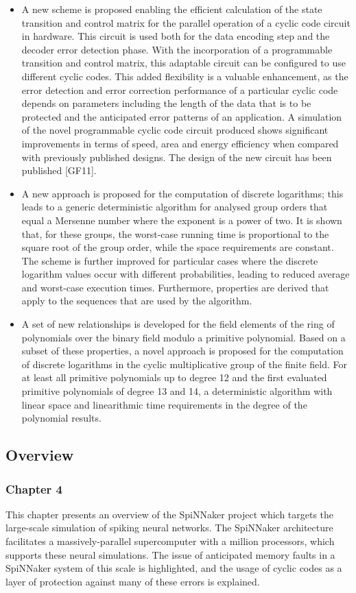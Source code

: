 \documentclass[a4paper, 11pt]{article}
\begin{document}
\begin{itemize}
\item A new scheme is proposed enabling the efficient calculation of the state transition and control matrix for the parallel operation of a cyclic code circuit in hardware. This circuit is used both for the data encoding step and the decoder error detection phase. With the incorporation of a programmable transition and control matrix, this adaptable circuit can be configured to use different cyclic codes. This added flexibility is a valuable enhancement, as the error detection and error correction performance of a particular cyclic code depends on parameters including the length of the data that is to be protected and the anticipated error patterns of an application. A simulation of the novel programmable cyclic code circuit produced shows significant improvements in terms of speed, area and energy efficiency when compared with previously published designs. The design of the new circuit has been published [GF11].
\item A new approach is proposed for the computation of discrete logarithms; this leads to a generic deterministic algorithm for analysed group orders that equal a Mersenne number where the exponent is a power of two. It is shown that, for these groups, the worst-case running time is proportional to the square root of the group order, while the space requirements are constant. The scheme is further improved for particular cases where the discrete logarithm values occur with different probabilities, leading to reduced average and worst-case execution times. Furthermore, properties are derived that apply to the sequences that are used by the algorithm.
\item A set of new relationships is developed for the field elements of the ring of polynomials over the binary field modulo a primitive polynomial. Based on a subset of these properties, a novel approach is proposed for the computation of discrete logarithms in the cyclic multiplicative group of the finite field. For at least all primitive polynomials up to degree 12 and the first evaluated primitive polynomials of degree 13 and 14, a deterministic algorithm with linear space and linearithmic time requirements in the degree of the polynomial results.
\end{itemize}

\subsection{Overview}
\subsubsection{Chapter 4}
This chapter presents an overview of the SpiNNaker project which targets the large-scale simulation of spiking neural networks. The SpiNNaker architecture facilitates a massively-parallel supercomputer with a million processors, which supports these neural simulations. The issue of anticipated memory faults in a SpiNNaker system of this scale is highlighted, and the usage of cyclic codes as a layer of protection against many of these errors is explained.
\end{document}
